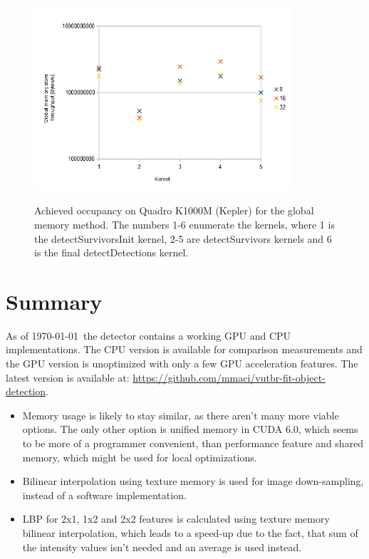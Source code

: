 \begin{center}
\begin{figure}[h]
	\centering\includegraphics[width=0.85\textwidth]{fig/store_gthroughput_quadro.png}\label{fig:store-g-throughput}
	\caption{Achieved occupancy on Quadro K1000M (Kepler) for the global memory method. The numbers 1-6 enumerate the kernels, where 1 is the detectSurvivorsInit kernel, 2-5 are detectSurvivors kernels and 6 is the final detectDetections kernel.}
\end{figure}
\end{center}

\section{Summary}

As of \today ~the detector contains a working GPU and CPU implementations. The CPU version is available for comparison measurements and the GPU version is unoptimized with only a few GPU acceleration features. The latest version is available at: \url{https://github.com/mmaci/vutbr-fit-object-detection}.

\begin{itemize}
	\item Memory usage is likely to stay similar, as there aren't many more viable options. The only other option is unified memory in CUDA 6.0, which seems to be more of a programmer convenient, than performance feature and shared memory, which might be used for local optimizations.
	\item Bilinear interpolation using texture memory is used for image down-sampling, instead of a software implementation.
	\item LBP for 2x1, 1x2 and 2x2 features is calculated using texture memory bilinear interpolation, which leads to a speed-up due to the fact, that sum of the intensity values isn't needed and an average is used instead.
\end{itemize}

